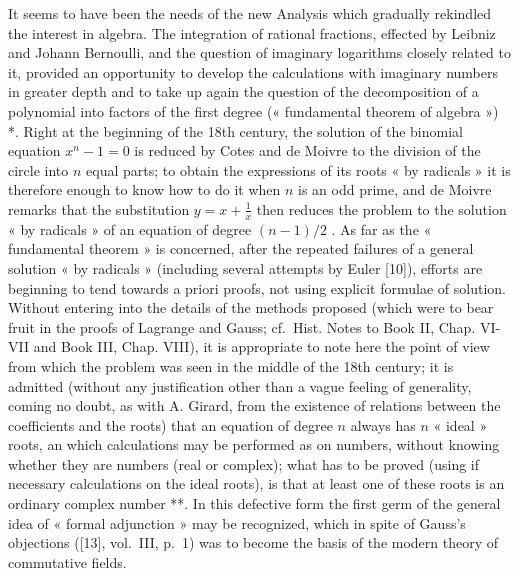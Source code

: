It seems to have been the needs of the new Analysis which gradually rekindled the interest in algebra. The integration of rational fractions, effected by Leibniz and Johann Bernoulli, and the question of imaginary logarithms closely related to it, provided an opportunity to develop the calculations with imaginary numbers in greater depth and to take up again the question of the decomposition of a polynomial into factors of the first degree (« fundamental theorem of algebra ») *. Right at the beginning of the 18th century, the solution of the binomial equation \(x^n - 1 = 0\) is reduced by Cotes and de Moivre to the division of the circle into \(n\) equal parts; to obtain the expressions of its roots « by radicals » it is therefore enough to know how to do it when \(n\) is an odd prime, and de Moivre remarks that the substitution \(y = x + \frac{1}{x}\) then reduces the problem to the solution « by radicals » of an equation of degree \((n - 1)/2\) . As far as the « fundamental theorem » is concerned, after the repeated failures of a general solution « by radicals » (including several attempts by Euler {[}10{]}), efforts are beginning to tend towards a priori proofs, not using explicit formulae of solution. Without entering into the details of the methods proposed (which were to bear fruit in the proofs of Lagrange and Gauss; cf.~Hist. Notes to Book II, Chap. VI-VII and Book III, Chap. VIII), it is appropriate to note here the point of view from which the problem was seen in the middle of the 18th century; it is admitted (without any justification other than a vague feeling of generality, coming no doubt, as with A. Girard, from the existence of relations between the coefficients and the roots) that an equation of degree \(n\) always has \(n\) « ideal » roots, an which calculations may be performed as on numbers, without knowing whether they are numbers (real or complex); what has to be proved (using if necessary calculations on the ideal roots), is that at least one of these roots is an ordinary complex number **. In this defective form the first germ of the general idea of « formal adjunction » may be recognized, which in spite of Gauss's objections ({[}13{]}, vol.~III, p.~1) was to become the basis of the modern theory of commutative fields.


